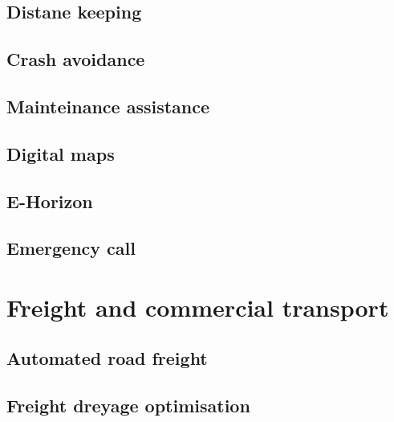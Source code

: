\documentclass[
]{book}
\begin{document}
\hypertarget{distane-keeping}{%
\section{Distane keeping}\label{distane-keeping}}

\hypertarget{crash-avoidance}{%
\section{Crash avoidance}\label{crash-avoidance}}

\hypertarget{mainteinance-assistance}{%
\section{Mainteinance assistance}\label{mainteinance-assistance}}

\hypertarget{digital-maps}{%
\section{Digital maps}\label{digital-maps}}

\hypertarget{e-horizon}{%
\section{E-Horizon}\label{e-horizon}}

\hypertarget{emergency-call}{%
\section{Emergency call}\label{emergency-call}}

\hypertarget{freight}{%
\chapter{Freight and commercial transport}\label{freight}}

\hypertarget{automated-road-freight}{%
\section{Automated road freight}\label{automated-road-freight}}

\hypertarget{freight-dreyage-optimisation}{%
\section{Freight dreyage optimisation}\label{freight-dreyage-optimisation}}
\end{document}

